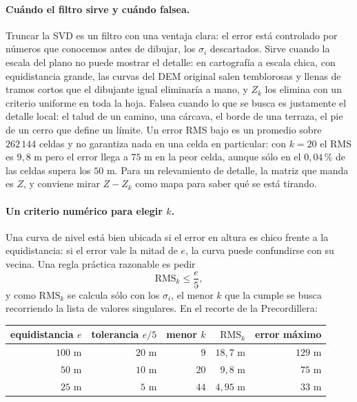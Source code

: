\paragraph{Cuándo el filtro sirve y cuándo falsea.} Truncar la SVD es un filtro con una
ventaja clara: el error está controlado por números que conocemos antes de dibujar, los
\(\sigma_i\) descartados. Sirve cuando la escala del plano no puede mostrar el detalle: en
cartografía a escala chica, con equidistancia grande, las curvas del DEM original salen
temblorosas y llenas de tramos cortos que el dibujante igual eliminaría a mano, y \(Z_k\) los
elimina con un criterio uniforme en toda la hoja. Falsea cuando lo que se busca es justamente
el detalle local: el talud de un camino, una cárcava, el borde de una terraza, el pie de un
cerro que define un límite. Un error RMS bajo es un promedio sobre \(262\,144\) celdas y no
garantiza nada en una celda en particular: con \(k=20\) el RMS es \(9{,}8\) m pero el error
llega a \(75\) m en la peor celda, aunque sólo en el \(0{,}04\)\,\% de las celdas supera los
\(50\) m. Para un relevamiento de detalle, la matriz que manda es \(Z\), y conviene mirar
\(Z-Z_k\) como mapa para saber qué se está tirando.

\paragraph{Un criterio numérico para elegir \(k\).} Una curva de nivel está bien ubicada si
el error en altura es chico frente a la equidistancia: si el error vale la mitad de \(e\), la
curva puede confundirse con su vecina. Una regla práctica razonable es pedir
\[
  \mathrm{RMS}_k\le\frac{e}{5},
\]
y como \(\mathrm{RMS}_k\) se calcula sólo con los \(\sigma_i\), el menor \(k\) que la cumple
se busca recorriendo la lista de valores singulares. En el recorte de la Precordillera:

{\small
\begin{center}
\begin{tabular}{r r r r r}
\toprule
equidistancia \(e\) & tolerancia \(e/5\) & menor \(k\) & \(\mathrm{RMS}_k\) & error máximo\\
\midrule
\(100\) m & \(20\) m & \(9\) & \(18{,}7\) m & \(129\) m\\
\(50\) m & \(10\) m & \(20\) & \(9{,}8\) m & \(75\) m\\
\(25\) m & \(5\) m & \(44\) & \(4{,}95\) m & \(33\) m\\
\bottomrule
\end{tabular}
\end{center}
}

